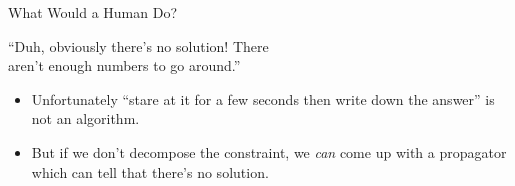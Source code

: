 \documentclass[aspectratio=169,compress,10pt]{beamer}
\begin{document}
\begin{frame}{What Would a Human Do?}
    \begin{center}
        ``Duh, obviously there's no solution! There \\ aren't enough numbers to go around.''
    \end{center}

    \begin{itemize}
        \item Unfortunately ``stare at it for a few seconds then write down the answer'' is not an algorithm.

        \item But if we don't decompose the constraint, we \emph{can} come up with a propagator
            which can tell that there's no solution.
    \end{itemize}
\end{frame}
\end{document}

